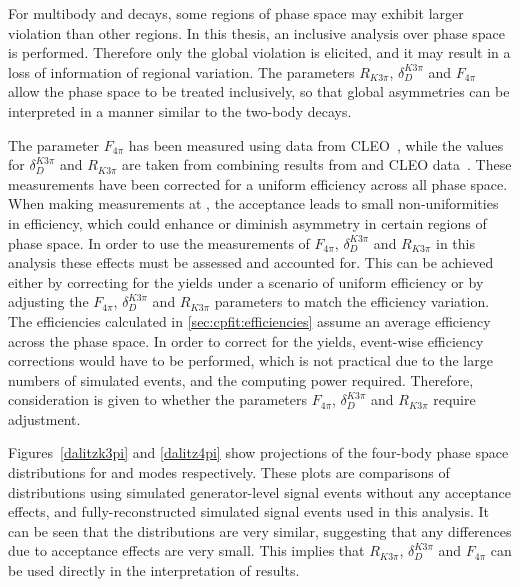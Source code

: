 For multibody \decay{\Dz}{\Kmp\pipm\pimp\pipm} and \decay{\Dz}{\pip\pim\pip\pim} decays, some regions of phase space may exhibit larger \CP violation than other regions. In this thesis, an inclusive analysis over phase space is performed. Therefore only the global \CP violation is elicited, and it may result in a loss of information of regional variation. The parameters $R_{K3\pi}$, $\delta_D^{K3\pi}$ and $F_{4\pi}$ allow the phase space to be treated inclusively, so that global asymmetries can be interpreted in a manner similar to the two-body \Dz decays.

The parameter $F_{4\pi}$ has been measured using data from CLEO~\cite{charm4pi}, while the values for $\delta_D^{K3\pi}$ and $R_{K3\pi}$ are taken from combining results from \lhcb and CLEO data~\cite{charmk3pi,charmk3pi_errata,LHCb-PAPER-2015-057}. These measurements have been corrected for a uniform efficiency across all phase space. When making measurements at \lhcb, the \lhcb acceptance leads to small non-uniformities in efficiency, which could enhance or diminish asymmetry in certain regions of phase space. In order to use the measurements of $F_{4\pi}$, $\delta_D^{K3\pi}$ and $R_{K3\pi}$ in this analysis these effects must be assessed and accounted for. This can be achieved either by correcting for the \lhcb yields under a scenario of uniform efficiency or by adjusting the $F_{4\pi}$, $\delta_D^{K3\pi}$ and $R_{K3\pi}$ parameters to match the \lhcb efficiency variation. The efficiencies calculated in \sect\ref{sec:cpfit:efficiencies} assume an average efficiency across the phase space. In order to correct for the \lhcb yields, event-wise efficiency corrections would have to be performed, which is not practical due to the large numbers of simulated events, and the computing power required. Therefore, consideration is given to whether the parameters $F_{4\pi}$, $\delta_D^{K3\pi}$ and $R_{K3\pi}$ require adjustment.

Figures~\ref{dalitzk3pi} and \ref{dalitz4pi} show projections of the four-body phase space distributions for \kpipipi and \pipipipi modes respectively. These plots are comparisons of distributions using simulated generator-level signal events without any acceptance effects, and fully-reconstructed simulated signal events used in this analysis. It can be seen that the distributions are very similar, suggesting that any differences due to \lhcb acceptance effects are very small. This implies that $R_{K3\pi}$, $\delta_D^{K3\pi}$ and $F_{4\pi}$ can be used directly in the interpretation of \lhcb results.

